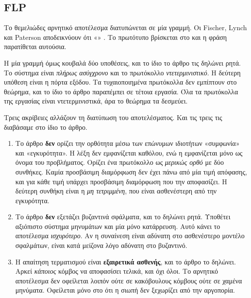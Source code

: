 \subsection{FLP}

Το θεμελιώδες αρνητικό αποτέλεσμα διατυπώνεται σε μία γραμμή. Οι
Fischer, Lynch και Paterson αποδεικνύουν ότι «» \cite{fischer1985impossibility}.
Το πρωτότυπο βρίσκεται στο  και η φράση παρατίθεται αυτούσια.

Η μία γραμμή όμως κουβαλά δύο υποθέσεις, και το ίδιο το άρθρο τις
δηλώνει ρητά. Το σύστημα είναι \emph{πλήρως ασύγχρονο} και το πρωτόκολλο
\emph{ντετερμινιστικό}. Η δεύτερη υπόθεση είναι η πόρτα εξόδου. Τα
τυχαιοποιημένα πρωτόκολλα δεν εμπίπτουν στο θεώρημα, και το ίδιο το
άρθρο παραπέμπει σε τέτοια εργασία. Όλα τα πρωτόκολλα της εργασίας είναι
ντετερμινιστικά, άρα το θεώρημα τα δεσμεύει.

Τρεις ακρίβειες αλλάζουν τη διατύπωση του αποτελέσματος. Και τις τρεις
τις διαβάσαμε στο ίδιο το άρθρο.

\begin{enumerate}
  \item Το άρθρο \textbf{δεν} ορίζει την ορθότητα μέσω των επώνυμων
  ιδιοτήτων «συμφωνία» και «εγκυρότητα». Η λέξη  δεν
  εμφανίζεται καθόλου, ενώ η  εμφανίζεται μόνο ως όνομα
  του προβλήματος. Ορίζει ένα πρωτόκολλο ως \emph{μερικώς ορθό} με δύο
  συνθήκες. Καμία προσβάσιμη διαμόρφωση δεν έχει πάνω από μία τιμή
  απόφασης, και για κάθε τιμή υπάρχει προσβάσιμη διαμόρφωση που την
  αποφασίζει. Η δεύτερη συνθήκη είναι η \emph{μη τετριμμένη}, που είναι
  ασθενέστερη από την εγκυρότητα.
  \item Το άρθρο \textbf{δεν} εξετάζει βυζαντινά σφάλματα, και το
  δηλώνει ρητά. Υποθέτει αξιόπιστο σύστημα μηνυμάτων και μία μόνο
  κατάρρευση. Αυτό κάνει το αποτέλεσμα \emph{ισχυρότερο}. Αν η συναίνεση
  είναι αδύνατη στο ασθενέστερο μοντέλο σφαλμάτων, είναι κατά μείζονα
  λόγο αδύνατη στο βυζαντινό.
  \item Η απαίτηση τερματισμού είναι \textbf{εξαιρετικά ασθενής}, και το
  άρθρο το δηλώνει. Αρκεί \emph{κάποιος} κόμβος να αποφασίσει τελικά,
  και όχι όλοι. Το αρνητικό αποτέλεσμα δεν οφείλεται λοιπόν ούτε σε
  κακόβουλους κόμβους ούτε σε χαμένα μηνύματα. Οφείλεται μόνο στο ότι η
  σιωπή δεν ξεχωρίζει από την αργοπορία.
\end{enumerate}


